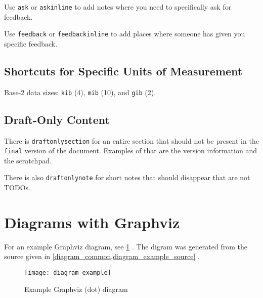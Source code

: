 Use \lstinline{ask}
or \lstinline{askinline} to add notes where you need to specifically ask for feedback.


Use \lstinline{feedback}
or \lstinline{feedbackinline} to add places where someone has given you specific feedback.



\subsection{Shortcuts for Specific Units of Measurement}

Base-2 data sizes:
\lstinline{kib} (\SI{4}{\kib}),
\lstinline{mib} (\SI{10}{\mib}),
and
\lstinline{gib} (\SI{2}{\gib}).


\subsection{Draft-Only Content}

There is \lstinline{draftonlysection} for an entire section that should not be present in the \lstinline{final} version of the document.
Examples of that are the version information and the scratchpad.

There is also \lstinline{draftonlynote} for short notes that should disappear that are not TODOs.



\section{Diagrams with Graphviz}

For an example Graphviz diagram, see
\cref{diagram_example}%
.
The digram was generated from the source given in
\cref{diagram_common,diagram_example_source}%
.

\begin{figure}[h]
    \centering
    \texttt{[image: diagram\_example]}
    \caption{Example Graphviz (dot) diagram}
    \label{diagram_example}
\end{figure}



